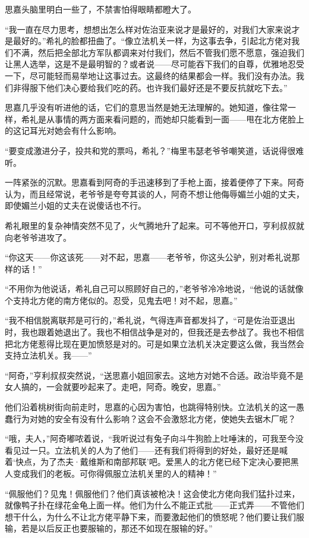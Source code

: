 \par 思嘉头脑里明白一些了，不禁害怕得眼睛都瞪大了。
\par “我一直在尽力思考，想想出怎么样对佐治亚来说才是最好的，对我们大家来说才是最好的。”希礼的脸都扭曲了。“像立法机关一样，为这事去争，引起北方佬对我们不满，然后把全部北方军队都调来对付我们，然后不管我们愿不愿意，强迫我们让黑人选举，这是不是最明智的？或者说——尽可能吞下我们的自尊，优雅地忍受一下，尽可能轻而易举地让这事过去。这最终的结果都会一样。我们没有办法。我们非得服下他们决心要给我们吃的药。也许我们最好还是不要反抗就吃下去。”
\par 思嘉几乎没有听进他的话，它们的意思当然是她无法理解的。她知道，像往常一样，希礼是从事情的两方面来看问题的，而她却只能看到一面——甩在北方佬脸上的这记耳光对她会有什么影响。
\par “要变成激进分子，投共和党的票吗，希礼？”梅里韦瑟老爷爷嘲笑道，话说得很难听。
\par 一阵紧张的沉默。思嘉看到阿奇的手迅速移到了手枪上面，接着便停了下来。阿奇认为，而且经常说，老爷爷是夸夸其谈的人，阿奇不想让他侮辱媚兰小姐的丈夫，即使媚兰小姐的丈夫在说傻话也不行。
\par 希礼眼里的复杂神情突然不见了，火气腾地升了起来。可不等他开口，亨利叔叔就向老爷爷进攻了。
\par “你这天——你这该死——对不起，思嘉——老爷爷，你这头公驴，别对希礼说那样的话！”
\par “不用你为他说话，希礼自己可以照顾好自己的，”老爷爷冷冷地说，“他说的话就像个支持北方佬的南方佬似的。忍受，见鬼去吧！对不起，思嘉。”
\par “我不相信脱离联邦是可行的，”希礼说，气得连声音都发抖了，“可是佐治亚退出时，我也跟着她退出了。我也不相信战争是对的，但我还是去参战了。我也不相信把北方佬惹得比现在更加愤怒是对的。可是如果立法机关决定要这么做，我当然会支持立法机关。我——”
\par “阿奇，”亨利叔叔突然说，“送思嘉小姐回家去。这地方对她不合适。政治毕竟不是女人搞的，一会就要吵起来了。走吧，阿奇。晚安，思嘉。”
\par 他们沿着桃树街向前走时，思嘉的心因为害怕，也跳得特别快。立法机关的这一愚蠢行为对她的安全有没有什么影响？这会不会激怒北方佬，使她失去锯木厂呢？
\par “哦，夫人，”阿奇嘟哝着说，“我听说过有兔子向斗牛狗脸上吐唾沫的，可我至今没看见过一只。立法机关的人为了他们——还有我们将得到的好处，最好还是喊着‘快点，为了杰夫·戴维斯和南部邦联’吧。爱黑人的北方佬已经下定决心要把黑人变成我们的老板。可你得佩服立法机关里的人的精神！”
\par “佩服他们？见鬼！佩服他们？他们真该被枪决！这会使北方佬向我们猛扑过来，就像鸭子扑在绿花金龟上面一样。他们为什么不能正式批——正式弄——不管他们想干什么，为什么不让北方佬平静下来，而要激起他们的愤怒呢？他们要让我们服输，若是以后反正也要服输的，那还不如现在服输的好。”
